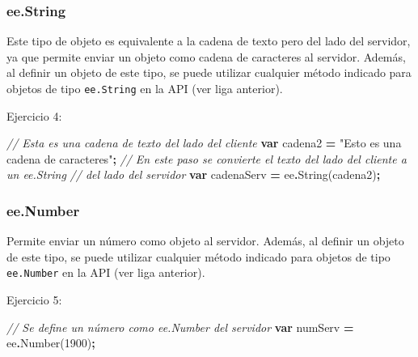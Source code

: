 \documentclass[
  12pt,
  letterpaper,
  twoside]{book}
\newenvironment{Shaded}{\begin{snugshade}}{\end{snugshade}}
\newcommand{\CommentTok}[1]{\textcolor[rgb]{0.56,0.35,0.01}{\textit{#1}}}
\newcommand{\DecValTok}[1]{\textcolor[rgb]{0.00,0.00,0.81}{#1}}
\newcommand{\FunctionTok}[1]{\textcolor[rgb]{0.00,0.00,0.00}{#1}}
\newcommand{\KeywordTok}[1]{\textcolor[rgb]{0.13,0.29,0.53}{\textbf{#1}}}
\newcommand{\NormalTok}[1]{#1}
\newcommand{\OperatorTok}[1]{\textcolor[rgb]{0.81,0.36,0.00}{\textbf{#1}}}
\newcommand{\StringTok}[1]{\textcolor[rgb]{0.31,0.60,0.02}{#1}}
\begin{document}
\hypertarget{ee.string}{%
\subsubsection*{ee.String}\label{ee.string}}

Este tipo de objeto es equivalente a la cadena de texto pero del lado del servidor, ya que permite enviar un objeto como cadena de caracteres al servidor. Además, al definir un objeto de este tipo, se puede utilizar cualquier método indicado para objetos de tipo \texttt{ee.String} en la API (ver liga anterior).

Ejercicio 4:

\begin{Shaded}
\begin{Highlighting}[]
\CommentTok{// Esta es una cadena de texto del lado del cliente}
\KeywordTok{var}\NormalTok{ cadena2 }\OperatorTok{=} \StringTok{"Esto es una cadena de caracteres"}\OperatorTok{;}
\CommentTok{// En este paso se convierte el texto del lado del cliente a un ee.String}
\CommentTok{// del lado del servidor}
\KeywordTok{var}\NormalTok{ cadenaServ }\OperatorTok{=}\NormalTok{ ee}\OperatorTok{.}\FunctionTok{String}\NormalTok{(cadena2)}\OperatorTok{;}                         
\end{Highlighting}
\end{Shaded}

\hypertarget{ee.number}{%
\subsubsection*{ee.Number}\label{ee.number}}

Permite enviar un número como objeto al servidor. Además, al definir un objeto de este tipo, se puede utilizar cualquier método indicado para objetos de tipo \texttt{ee.Number} en la API (ver liga anterior).

Ejercicio 5:

\begin{Shaded}
\begin{Highlighting}[]
\CommentTok{// Se define un número como \textasciigrave{}ee.Number\textasciigrave{} del servidor}
\KeywordTok{var}\NormalTok{ numServ }\OperatorTok{=}\NormalTok{ ee}\OperatorTok{.}\FunctionTok{Number}\NormalTok{(}\DecValTok{1900}\NormalTok{)}\OperatorTok{;}                              
\end{Highlighting}
\end{Shaded}
\end{document}
